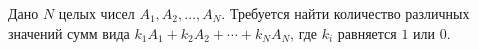 Дано $N$ целых чисел $A_1, A_2, \ldots, A_N$. Требуется найти количество различных значений сумм вида
$k_1A_1 + k_2A_2 + \cdots + k_NA_N$, где $k_i$ равняется $1$ или $0$.
